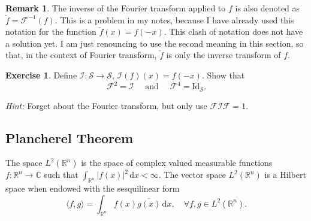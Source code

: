 \documentclass[a4paper,9pt]{amsart}
\newcommand{\scr}[1]{\mathscr{#1}}
\newcommand{\cal}[1]{\mathcal{#1}}
\newcommand{\R}{\mathbb{R}}	%
\newcommand{\C}{\mathbb{C}}	%
\newcommand{\Id}{\mathrm{Id}}	%
\newcommand{\did}{\,\mathrm{d}}	%
\theoremstyle{plain}
\theoremstyle{definition}
\newtheorem{remark}[proposition]{Remark}
\newtheorem{exercise}[proposition]{Exercise}%
\theoremstyle{remark}
\begin{document}
\begin{remark}
	The inverse of the Fourier transform applied to $f$ is also denoted as $\check f=\scr F^{-1}(f)$.
	This is a problem in my notes, because I have already used this notation for the function $\check f(x) = f(-x)$.
	This clash of notation does not have a solution yet.
	I am just renouncing to use the second meaning in this section, so that, in the context of Fourier transform, $\check f$ is only the inverse transform of $f$.
\end{remark}

\begin{exercise}
	Define $\cal I:\scr S\to\scr S$, $\cal I(f)(x) = f(-x)$.
	Show that
	\begin{equation}
		\scr F^2 = \cal I
		\quad\text{ and }\quad
		\scr F^4 = \Id_{\scr S} .
	\end{equation}
	
	{\it Hint:}
	Forget about the Fourier transform, but only use $\scr F\cal I\scr F=1$.
\end{exercise}

\subsection{Plancherel Theorem}

The space $L^2(\R^n)$ is the space of complex valued measurable functions $f:\R^n\to\C$ 
such that $\int_{\R^n} |f(x)|^2 \did x <\infty$.
The vector space $L^2(\R^n)$ is a Hilbert space when endowed with the sesquilinear form
\begin{equation}
	\langle f,g \rangle = \int_{\R^n} f(x) \bar{g(x)} \did x ,
	\quad\forall f,g\in L^2(\R^n) .
\end{equation}
\end{document}
